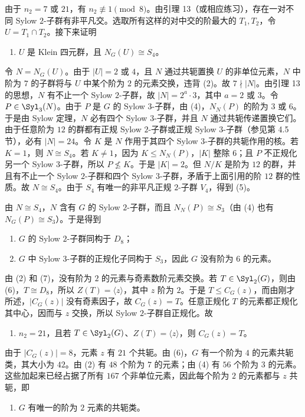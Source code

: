 由于 $n_2=7$ 或 $21$，有 $n_2\not\equiv1\pmod 8$。由引理 13（或相应练习），存在一对不同 Sylow $2$-子群有非平凡交。选取所有这样的对中交的阶最大的 $T_1,T_2$，令 $U=T_1\cap T_2$。接下来证明
\begin{enumerate}[label=(\arabic*),resume]
  \item $U$ 是 Klein 四元群，且 $N_G(U)\cong S_4$。
\end{enumerate}

令 $N=N_G(U)$。由于 $|U|=2$ 或 $4$，且 $N$ 通过共轭置换 $U$ 的非单位元素，$N$ 中阶为 $7$ 的子群将与 $U$ 中某个阶为 $2$ 的元素交换，违背 (2)。故 $7\nmid |N|$。由引理 13 的思想，$N$ 有不止一个 Sylow $2$-子群，故 $|N|=2^a\cdot3$，其中 $a=2$ 或 $3$。令 $P\in\Syl_3(N)$。由于 $P$ 是 $G$ 的 Sylow $3$-子群，由 (4)，$N_N(P)$ 的阶为 $3$ 或 $6$。于是由 Sylow 定理，$N$ 必有四个 Sylow $3$-子群，并且 $N$ 通过共轭传递置换它们。由于任意阶为 $12$ 的群都有正规 Sylow $2$-子群或正规 Sylow $3$-子群（参见第 4.5 节），必有 $|N|=24$。令 $K$ 是 $N$ 作用于其四个 Sylow $3$-子群的共轭作用的核。若 $K=1$，则 $N\cong S_4$。若 $K\neq1$，因为 $K\leq N_N(P)$，$|K|$ 整除 $6$；且 $P$ 不正规化另一个 Sylow $3$-子群，所以 $P\nleq K$。于是 $|K|=2$。但 $N/K$ 是阶为 $12$ 的群，并且有不止一个 Sylow $2$-子群和四个 Sylow $3$-子群，矛盾于上面引用的阶 $12$ 群的性质。故 $N\cong S_4$。由于 $S_4$ 有唯一的非平凡正规 $2$-子群 $V_4$，得到 (5)。

由 $N\cong S_4$，$N$ 含有 $G$ 的 Sylow $2$-子群，而且 $N_N(P)\cong S_3$（由 (4) 也有 $N_G(P)\cong S_3$）。于是得到
\begin{enumerate}[label=(\arabic*),resume]
  \item $G$ 的 Sylow $2$-子群同构于 $D_8$；
  \item $G$ 中 Sylow $3$-子群的正规化子同构于 $S_3$，因此 $G$ 没有阶为 $6$ 的元素。
\end{enumerate}

由 (2) 和 (7)，没有阶为 $2$ 的元素与奇素数阶元素交换。若 $T\in\Syl_2(G)$，则由 (6)，$T\cong D_8$，所以 $Z(T)=\langle z\rangle$，其中 $z$ 阶为 $2$。于是 $T\leq C_G(z)$，而由刚才所述，$|C_G(z)|$ 没有奇素因子，故 $C_G(z)=T$。任意正规化 $T$ 的元素都正规化其中心，因而与 $z$ 交换，所以 Sylow $2$-子群自正规化。故
\begin{enumerate}[label=(\arabic*),resume]
  \item $n_2=21$，且若 $T\in\Syl_2(G)$、$Z(T)=\langle z\rangle$，则 $C_G(z)=T$。
\end{enumerate}

由于 $|C_G(z)|=8$，元素 $z$ 有 $21$ 个共轭。由 (6)，$G$ 有一个阶为 $4$ 的元素共轭类，其大小为 $42$。由 (2) 有 $48$ 个阶为 $7$ 的元素；由 (4) 有 $56$ 个阶为 $3$ 的元素。这些加起来已经占据了所有 $167$ 个非单位元素，因此每个阶为 $2$ 的元素都与 $z$ 共轭，即
\begin{enumerate}[label=(\arabic*),resume]
  \item $G$ 有唯一的阶为 $2$ 元素的共轭类。
\end{enumerate}

